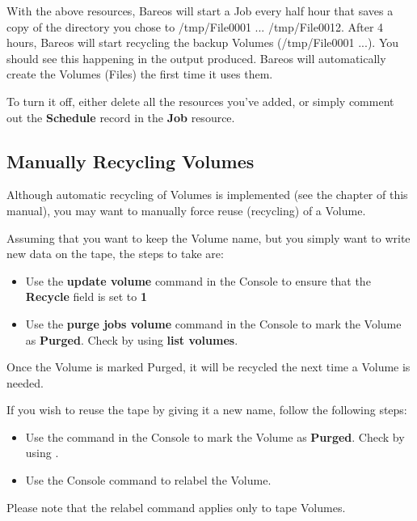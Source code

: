 With the above resources, Bareos will start a Job every half hour that saves a
copy of the directory you chose to /tmp/File0001 ... /tmp/File0012. After 4
hours, Bareos will start recycling the backup Volumes (/tmp/File0001 ...). You
should see this happening in the output produced. Bareos will automatically
create the Volumes (Files) the first time it uses them.

To turn it off, either delete all the resources you've added, or simply
comment out the {\bf Schedule} record in the {\bf Job} resource.

\subsection{Manually Recycling Volumes}
\label{manualrecycling}


Although automatic recycling of Volumes is implemented (see the
 chapter of
this manual), you may want to manually force reuse (recycling) of a Volume.

Assuming that you want to keep the Volume name, but you simply want to write
new data on the tape, the steps to take are:

\begin{itemize}
\item Use the {\bf update volume} command in the Console to  ensure that the
   {\bf Recycle} field is set to {\bf 1}
\item Use the {\bf purge jobs volume} command in the Console  to mark the
   Volume as {\bf Purged}. Check by using  {\bf list volumes}.
\end{itemize}

Once the Volume is marked Purged, it will be recycled the next time a Volume
is needed.

If you wish to reuse the tape by giving it a new name, follow the following
steps:

\begin{itemize}
\item Use the  command in the Console  to mark the
   Volume as {\bf Purged}. Check by using  .
\item Use the Console   command to relabel the Volume.
\end{itemize}

Please note that the relabel command applies only to tape Volumes.

